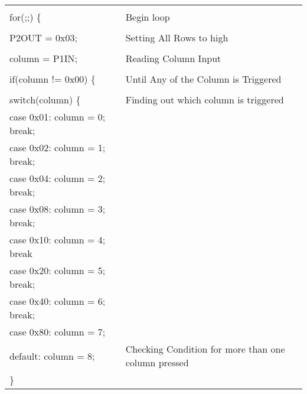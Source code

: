 \documentclass[12pt, letterpaper]{article}
\begin{document}
\begin{longtable}{|p{8cm}||p{6cm}|}
   \hspace{0.1cm} & \\
  \hspace{0.1cm}  for(;;) \{   &  Begin loop\\
  \hspace{0.1cm} & \\
     \hspace{0.3cm}   P2OUT = 0x03; & Setting All Rows to high\\   
\hspace{0.1cm} & \\
     \hspace{0.3cm}   column = P1IN; & Reading Column Input\\
     \hspace{0.1cm} & \\
      \hspace{0.3cm}  if(column != 0x00) \{ & Until Any of the Column is Triggered \\
\hspace{0.1cm} & \\
      \hspace{0.3cm}   switch(column) \{ & Finding out which column is triggered \\
        \hspace{0.5cm}     case 0x01: column = 0; break; & \\ 
        \hspace{0.5cm}    case 0x02: column = 1; break; & \\
        \hspace{0.5cm}   case 0x04: column = 2; break;& \\
        \hspace{0.5cm}    case 0x08: column = 3; break; & \\
        \hspace{0.5cm}    case 0x10: column = 4; break & \\
        \hspace{0.5cm}    case 0x20: column = 5; break; & \\
        \hspace{0.5cm}    case 0x40: column = 6; break; &  \\
            \hspace{0.5cm}   case 0x80: column = 7; & \\
            \hspace{0.5cm}     default: column = 8; & Checking Condition for more than one column pressed\\
            \hspace{0.3cm} \} & \\
            

\end{longtable}
\end{document}
